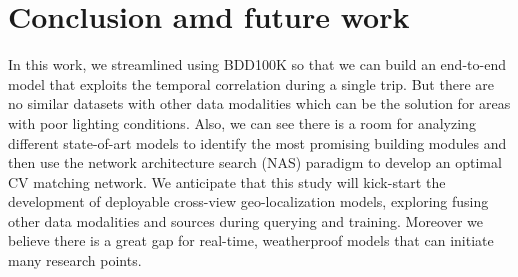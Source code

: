 \documentclass[10pt,letterpaper]{article}
\begin{document}
\section*{Conclusion amd future work}
In this work, we streamlined using BDD100K so that we can build an end-to-end model that exploits the temporal correlation during a single trip. But there are no similar datasets with other data modalities which can be the solution for areas with poor lighting conditions. Also, we can see there is a room for analyzing different state-of-art models to identify the most promising building modules and then use the network architecture search (NAS) paradigm to develop an optimal CV matching network. We anticipate that this study will kick-start the development of deployable cross-view geo-localization models, exploring fusing other data modalities and sources during querying and training. Moreover we believe there is a great gap for real-time, weatherproof models that can initiate many research points.

\nolinenumbers
\end{document}
